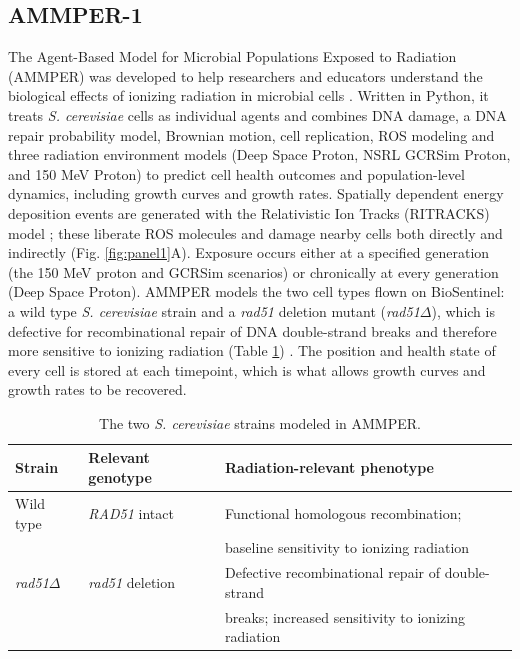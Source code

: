 \documentclass{asmarticle}
\begin{document}
\subsection{AMMPER-1}
The Agent-Based Model for Microbial Populations Exposed to Radiation (AMMPER) was developed to help researchers and educators understand the biological effects of ionizing radiation in microbial cells \cite{singh2023agent}. Written in Python, it treats \textit{S. cerevisiae} cells as individual agents and combines DNA damage, a DNA repair probability model, Brownian motion, cell replication, ROS modeling and three radiation environment models (Deep Space Proton, NSRL GCRSim Proton, and 150 MeV Proton) to predict cell health outcomes and population-level dynamics, including growth curves and growth rates. Spatially dependent energy deposition events are generated with the Relativistic Ion Tracks (RITRACKS) model \cite{plante2008ionization, plante2014ritracks}; these liberate ROS molecules and damage nearby cells both directly and indirectly (Fig. \ref{fig:panel1}A). Exposure occurs either at a specified generation (the 150 MeV proton and GCRSim scenarios) or chronically at every generation (Deep Space Proton). AMMPER models the two cell types flown on BioSentinel: a wild type \textit{S. cerevisiae} strain and a \textit{rad51} deletion mutant (\textit{rad51}$\Delta$), which is defective for recombinational repair of DNA double-strand breaks and therefore more sensitive to ionizing radiation (Table \ref{tab:strains}) \cite{massaro2023biosentinel}. The position and health state of every cell is stored at each timepoint, which is what allows growth curves and growth rates to be recovered.

\begin{table}[ht]
\centering
\caption{The two \textit{S. cerevisiae} strains modeled in AMMPER.}
\label{tab:strains}
\begin{tabular}{lll}
\hline
Strain & Relevant genotype & Radiation-relevant phenotype \\
\hline
Wild type & \textit{RAD51} intact & Functional homologous recombination; \\
 & & baseline sensitivity to ionizing radiation \\
\textit{rad51}$\Delta$ & \textit{rad51} deletion & Defective recombinational repair of double-strand \\
 & & breaks; increased sensitivity to ionizing radiation \\
\hline
\end{tabular}
\end{table}
\end{document}
